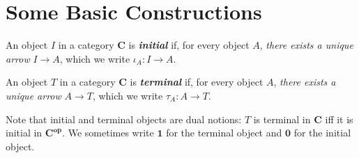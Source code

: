 \documentclass[]{amsbook}
\newcommand{\catname}[1]{\mathbf{#1}}
\newcommand{\0}{\mathbf{0}}
\newcommand{\1}{\mathbf{1}}
\begin{document}
\section{Some Basic Constructions}
An object $I$ in a category $\catname{C}$ is \emph{\textbf{initial}} if, for
every object $A$, \emph{there exists a unique arrow} $I \to A$, which we write
$\iota_{A}: I \to A$.

An object $T$ in a category $\catname{C}$ is \emph{\textbf{terminal}} if, for
every object $A$, \emph{there exists a unique arrow} $A \to T$, which we write
$\tau_{A}: A \to T$.

Note that initial and terminal objects are dual notions: $T$ is terminal in
$\catname{C}$ iff it is initial in $\catname{C}^{\mathbf{op}}$. We sometimes
write $\1$ for the terminal object and $\0$ for the initial object.
\end{document}
